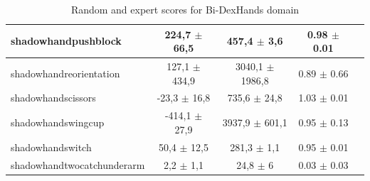 \documentclass{article}
\theoremstyle{plain}
\theoremstyle{definition}
\theoremstyle{remark}
\begin{document}
\begin{table}[]
{\begin{tabular}{|l|c|c|c|c|}
shadowhandpushblock          & 224,7 $\pm$ 66,5  & 457,4 $\pm$ 3,6     &               0.98 $\pm$ 0.01     \\ \hline
shadowhandreorientation      & 127,1 $\pm$ 434,9 & 3040,1 $\pm$ 1986,8 &               0.89 $\pm$ 0.66     \\ \hline
shadowhandscissors           & -23,3 $\pm$ 16,8  & 735,6 $\pm$ 24,8    &               1.03 $\pm$ 0.01     \\ \hline
shadowhandswingcup           & -414,1 $\pm$ 27,9 & 3937,9 $\pm$ 601,1  &               0.95 $\pm$ 0.13     \\ \hline
shadowhandswitch             & 50,4 $\pm$ 12,5   & 281,3 $\pm$ 1,1     &               0.95 $\pm$ 0.01     \\ \hline
shadowhandtwocatchunderarm   & 2,2 $\pm$ 1,1     & 24,8 $\pm$ 6        &               0.03 $\pm$ 0.03     \\ \hline
\end{tabular}}
\caption{Random and expert scores for Bi-DexHands domain}
\end{table}
\end{document}
